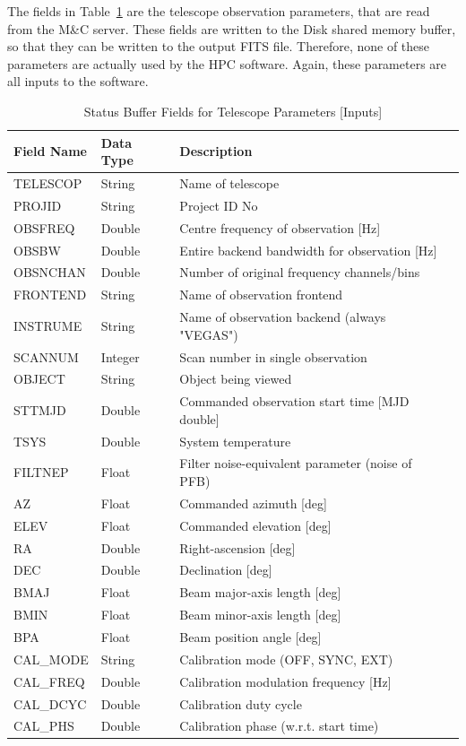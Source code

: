 \documentclass[11pt]{article} %
\begin{document}
The fields in Table~\ref{status-buffer-telescope} are the telescope observation parameters, that are read from the M\&C server. These fields are written to the Disk shared memory buffer, so that they can be written to the output FITS file. Therefore, none of these parameters are actually used by the HPC software. Again, these parameters are all inputs to the software.

\begin{table}[!h]
\centering
\caption{Status Buffer Fields for Telescope Parameters [Inputs]}
\begin{tabular}{l l l l}
\hline
\bf Field Name & \bf Data Type & \bf Description \\
\hline
TELESCOP & String & Name of telescope \\
PROJID & String & Project ID  No \\
OBSFREQ & Double & Centre frequency of observation [Hz] \\
OBSBW & Double & Entire backend bandwidth for observation [Hz] \\
OBSNCHAN & Double & Number of original frequency channels/bins \\
FRONTEND & String & Name of observation frontend \\
INSTRUME & String & Name of observation backend (always "VEGAS") \\
SCANNUM & Integer & Scan number in single observation \\
OBJECT & String & Object being viewed \\
STTMJD & Double & Commanded observation start time [MJD double] \\
TSYS & Double & System temperature \\
FILTNEP & Float & Filter noise-equivalent parameter (noise of PFB) \\
AZ & Float & Commanded azimuth [deg] \\
ELEV & Float & Commanded elevation [deg] \\
RA & Double & Right-ascension [deg] \\
DEC & Double & Declination [deg] \\
BMAJ & Float & Beam major-axis length [deg] \\
BMIN & Float & Beam minor-axis length [deg] \\
BPA & Float & Beam position angle [deg] \\
CAL\_MODE & String & Calibration mode (OFF, SYNC, EXT) \\
CAL\_FREQ & Double & Calibration modulation  frequency [Hz] \\
CAL\_DCYC & Double & Calibration duty cycle \\
CAL\_PHS & Double & Calibration phase (w.r.t. start time) \\
\hline
\end{tabular}
\label{status-buffer-telescope}
\end{table}
\end{document}
